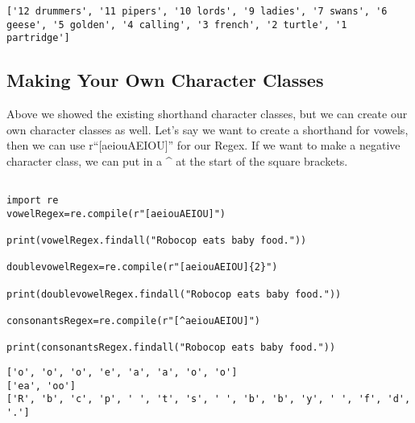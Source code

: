 \documentclass[11pt]{article}
\begin{document}
\begin{verbatim}
['12 drummers', '11 pipers', '10 lords', '9 ladies', '7 swans', '6 geese', '5 golden', '4 calling', '3 french', '2 turtle', '1 partridge']
\end{verbatim}

\subsection{Making Your Own Character Classes}
\label{sec:org27e2f6c}

Above we showed the existing shorthand character classes, but we can create our own character classes as well. Let's say we want to create a shorthand for vowels, then we can use r``[aeiouAEIOU]'' for our Regex. If we want to make a negative character class, we can put in a \^{} at the start of the square brackets.

\begin{verbatim}

import re
vowelRegex=re.compile(r"[aeiouAEIOU]")

print(vowelRegex.findall("Robocop eats baby food."))

doublevowelRegex=re.compile(r"[aeiouAEIOU]{2}")

print(doublevowelRegex.findall("Robocop eats baby food."))

consonantsRegex=re.compile(r"[^aeiouAEIOU]")

print(consonantsRegex.findall("Robocop eats baby food."))
\end{verbatim}

\begin{verbatim}
['o', 'o', 'o', 'e', 'a', 'a', 'o', 'o']
['ea', 'oo']
['R', 'b', 'c', 'p', ' ', 't', 's', ' ', 'b', 'b', 'y', ' ', 'f', 'd', '.']
\end{verbatim}
\end{document}
